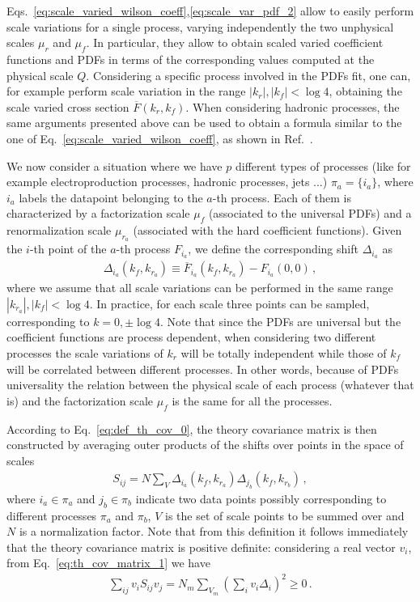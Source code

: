 %
Eqs.~\ref{eq:scale_varied_wilson_coeff},\ref{eq:scale_var_pdf_2} allow to easily perform scale variations for a single process,
varying independently the two unphysical scales $\mu_r$ and $\mu_f$.
In particular, they allow to obtain scaled varied coefficient functions and PDFs in terms of the corresponding values 
computed at the physical scale $Q$. 
Considering a specific process involved in the PDFs fit, one can, for example perform scale variation in the range
$|k_r|, |k_f| < \log 4$, obtaining the scale varied cross section $\overline{F}\left(k_r, k_f\right)$.
When considering hadronic processes,
the same arguments presented above can be used to obtain a formula similar to the one of Eq.~\eqref{eq:scale_varied_wilson_coeff},
as shown in Ref.~\cite{AbdulKhalek:2019ihb}.

%
We now consider a situation where we have $p$ different types of processes (like for example electroproduction processes, 
hadronic processes, jets ...) $\pi_a = \{i_a\}$, where $i_a$ labels the datapoint belonging to the $a$-th process.
Each of them is characterized by a factorization scale $\mu_f$ (associated to the universal PDFs) and a renormalization scale 
$\mu_{r_a}$ (associated with the hard coefficient functions).
Given the $i$-th point of the $a$-th process $F_{i_a}$, we define the corresponding shift $\Delta_{i_a}$ as 
\begin{align}
    \Delta_{i_a}\left(k_f,k_{r_a}\right) \equiv \overline{F}_{i_a}\left(k_f, k_{r_a}\right) - F_{i_a}\left(0, 0\right)\,,
\end{align}
where we assume that all scale variations can be performed in the same range $|k_{r_a}|, |k_f| < \log 4$.
In practice, for each scale three points can be sampled, corresponding to $k = 0, \pm \log 4$.
Note that since the PDFs are universal but the coefficient functions are process dependent,
when considering two different processes the scale variations of $k_{r}$ will be totally independent 
while those of $k_f$ will be correlated between different processes. 
In other words, because of PDFs universality the relation between the physical scale of each process (whatever that is)
and the factorization scale $\mu_f$ is the same for all the processes.

According to Eq.~\ref{eq:def_th_cov_0}, the theory covariance matrix is then constructed by averaging
outer products of the shifts over points in the space of scales 
\begin{align}
    \label{eq:th_cov_matrix_1}
    S_{ij} = N \sum_V \Delta_{i_a}\left(k_f,k_{r_a}\right) \Delta_{j_b}\left(k_f,k_{r_b}\right)\,,
\end{align} 
where $i_a \in \pi_a$ and $j_b \in \pi_b$ indicate two data points possibly corresponding to different
processes $\pi_a$ and $\pi_b$, $V$ is the set of scale points to be summed over and $N$ is a normalization factor.
Note that from this definition it follows immediately that the
theory covariance matrix is positive definite: considering a real vector $v_i$, from Eq.~\ref{eq:th_cov_matrix_1}
we have
\begin{align}
    \sum_{ij} v_i S_{ij} v_j = N_m \sum_{V_m}\left(\sum_i v_i \Delta_i\right)^2 \geq 0\,.
\end{align}



